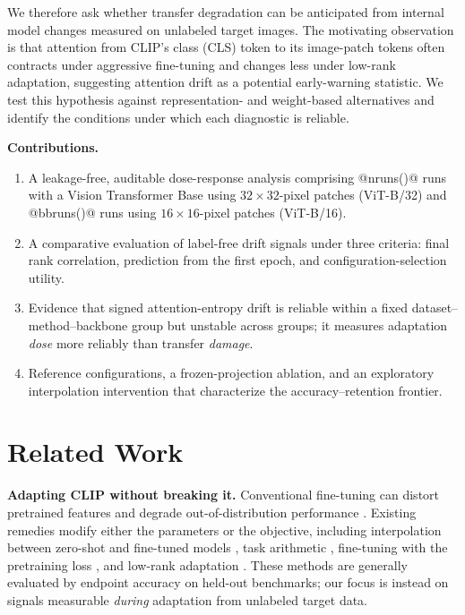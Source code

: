 \documentclass[conference]{IEEEtran}
\begin{document}
We therefore ask whether transfer degradation can be anticipated from internal model changes measured on unlabeled target images. The motivating observation is that attention from CLIP's class (CLS) token to its image-patch tokens often contracts under aggressive fine-tuning and changes less under low-rank adaptation, suggesting attention drift as a potential early-warning statistic. We test this hypothesis against representation- and weight-based alternatives and identify the conditions under which each diagnostic is reliable.

\textbf{Contributions.}
\begin{enumerate}
    \item A leakage-free, auditable dose-response analysis comprising @nruns()@ runs with a Vision Transformer Base using $32\!\times\!32$-pixel patches (ViT-B/32) and @bbruns()@ runs using $16\!\times\!16$-pixel patches (ViT-B/16).
    \item A comparative evaluation of label-free drift signals under three criteria: final rank correlation, prediction from the first epoch, and configuration-selection utility.
    \item Evidence that signed attention-entropy drift is reliable within a fixed dataset--method--backbone group but unstable across groups; it measures adaptation \emph{dose} more reliably than transfer \emph{damage}.
    \item Reference configurations, a frozen-projection ablation, and an exploratory interpolation intervention that characterize the accuracy--retention frontier.
\end{enumerate}

\section{Related Work}
\textbf{Adapting CLIP without breaking it.}
Conventional fine-tuning can distort pretrained features and degrade out-of-distribution performance \cite{kumar2022finetuning}. Existing remedies modify either the parameters or the objective, including interpolation between zero-shot and fine-tuned models \cite{wortsman2022robust}, task arithmetic \cite{ilharco2023editing}, fine-tuning with the pretraining loss \cite{goyal2023finetune}, and low-rank adaptation \cite{hu2022lora}. These methods are generally evaluated by endpoint accuracy on held-out benchmarks; our focus is instead on signals measurable \emph{during} adaptation from unlabeled target data.
\end{document}
